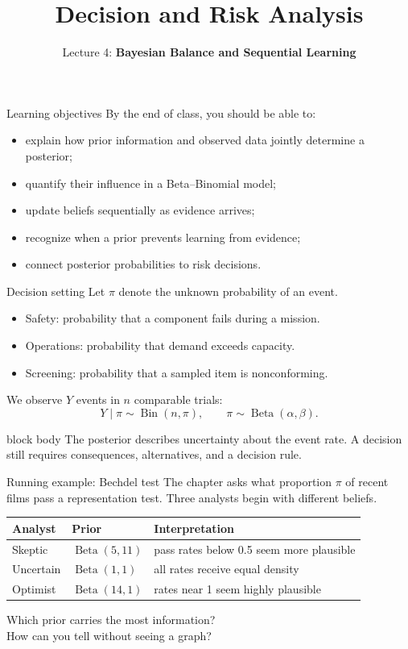 \documentclass[aspectratio=43,11pt]{beamer}
\title{Decision and Risk Analysis}
\subtitle{Lecture 4: \textbf{Bayesian Balance and Sequential Learning}}
\author{\emph{}}
\date{\color{aggiemaroon}{
DAEN 427 / ISEN 427 / ISEN 627\\
\textbf{Alexander Abuabara}\\
Fall 2026
}}
\newcommand{\riskbox}[1]{\begin{beamercolorbox}[rounded=true,sep=.8em]{block body} #1\end{beamercolorbox}}
\begin{document}
\begin{frame}\titlepage\end{frame}

\begin{frame}{Learning objectives}
By the end of class, you should be able to:
\begin{itemize}
  \item explain how prior information and observed data jointly determine a posterior;
  \item quantify their influence in a Beta--Binomial model;
  \item update beliefs sequentially as evidence arrives;
  \item recognize when a prior prevents learning from evidence;
  \item connect posterior probabilities to risk decisions.
\end{itemize}
\end{frame}

\begin{frame}{Decision setting}
Let $\pi$ denote the unknown probability of an event.
\begin{itemize}
  \item Safety: probability that a component fails during a mission.
  \item Operations: probability that demand exceeds capacity.
  \item Screening: probability that a sampled item is nonconforming.
\end{itemize}
We observe $Y$ events in $n$ comparable trials:
\[
Y\mid \pi \sim \operatorname{Bin}(n,\pi), \qquad
\pi\sim\operatorname{Beta}(\alpha,\beta).
\]
\riskbox{The posterior describes uncertainty about the event rate. A decision still requires consequences, alternatives, and a decision rule.}
\end{frame}













\begin{frame}{Running example: Bechdel test}
The chapter asks what proportion $\pi$ of recent films pass a representation test. Three analysts begin with different beliefs.
\begin{center}
\begin{tabular}{lll}
\toprule
Analyst & Prior & Interpretation \\
\midrule
Skeptic & $\operatorname{Beta}(5,11)$ & pass rates below 0.5 seem more plausible \\
Uncertain & $\operatorname{Beta}(1,1)$ & all rates receive equal density \\
Optimist & $\operatorname{Beta}(14,1)$ & rates near 1 seem highly plausible \\
\bottomrule
\end{tabular}
\end{center}
\vspace{.5em}
Which prior carries the most information?\\
How can you tell without seeing a graph?
\end{frame}
\end{document}
